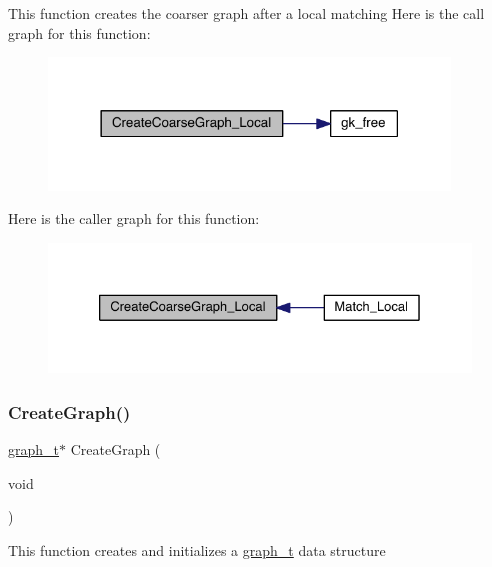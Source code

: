 This function creates the coarser graph after a local matching Here is the call graph for this function\+:\nopagebreak
\begin{figure}[H]
\begin{center}
\leavevmode
\includegraphics[width=302pt]{a00951_a15f0a144812a3f4ab58bb38a3398103d_cgraph}
\end{center}
\end{figure}
Here is the caller graph for this function\+:\nopagebreak
\begin{figure}[H]
\begin{center}
\leavevmode
\includegraphics[width=326pt]{a00951_a15f0a144812a3f4ab58bb38a3398103d_icgraph}
\end{center}
\end{figure}
\mbox{\label{a00951_a01903fa912de9fc7f01dace993a3fc85}} 
\subsubsection{\texorpdfstring{Create\+Graph()}{CreateGraph()}}
{\footnotesize\ttfamily \hyperlink{a00734}{graph\+\_\+t}$\ast$ Create\+Graph (\begin{DoxyParamCaption}\item[{void}]{ }\end{DoxyParamCaption})}

This function creates and initializes a \hyperlink{a00734}{graph\+\_\+t} data structure

